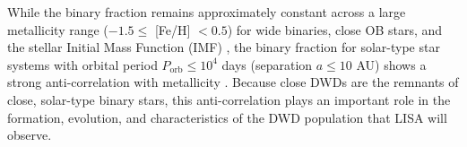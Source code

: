 \documentclass[twocolumn]{aastex631}
\begin{document}
While the binary fraction remains approximately constant across a large metallicity range ($-1.5 \leq$ [Fe/H] $< 0.5$) for wide binaries, close OB stars, and the stellar Initial Mass Function (IMF) \citep{Moe2017, Moe2019}, the binary fraction for solar-type star systems with orbital period $P_{\text{orb}}\leq 10^4$ days (separation $a \leq 10$ AU) shows a strong anti-correlation with metallicity \citep[e.g.][]{Badenes2018, Moe2019, Mazzola2020, Price-Whelan2020}. Because close DWDs are the remnants of close, solar-type binary stars, this anti-correlation plays an important role in the formation, evolution, and characteristics of the DWD population that LISA will observe.


\end{document}
